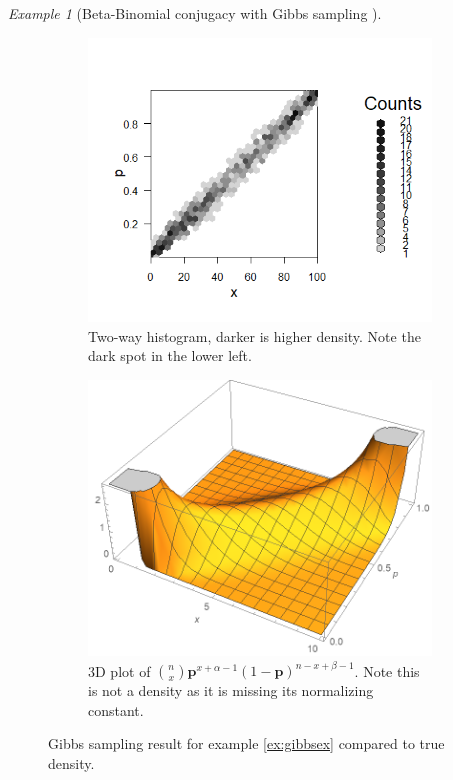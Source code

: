 \documentclass[11pt]{amsart}
\theoremstyle{theorem} %
\theoremstyle{definition}                  %
\theoremstyle{example}                       %
\theoremstyle{remark}                       %
\newtheorem{exmp}[thm]{Example}  %
\numberwithin{equation}{section}
\begin{document}
\begin{exmp}[{Beta-Binomial conjugacy with Gibbs sampling \cite{gibbs}}]
\begin{figure}
        \centering
        \begin{subfigure}[b]{0.475\textwidth}
            \centering
            \includegraphics[width=\textwidth]{bettergibbsEX.png}
            \caption{Two-way histogram, darker is higher density. Note the dark spot in the lower left.}    
            \label{fig:exex}
        \end{subfigure}
        \hfill
        \begin{subfigure}[b]{0.475\textwidth}  
            \centering 
            \includegraphics[width=\textwidth]{download5.png}
            \caption{3D plot of ${n \choose x} \mathbf{p}^{x+\alpha-1}(1-\mathbf{p})^{n-x+\beta-1}$. Note this is not a density as it is missing its normalizing constant.}    
            \label{fig:download}
        \end{subfigure}
        \caption{Gibbs sampling result for example  \ref{ex:gibbsex} compared to true density.} 
        \label{fig:gibbsex}
    \end{figure}

\end{exmp}
\end{document}
